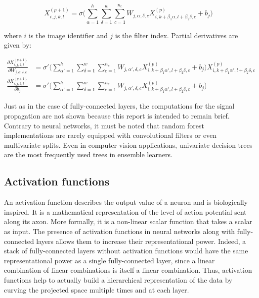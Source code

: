         \begin{equation} \label{eq:conv2D}
            X_{i, j, k, l}^{(p+1)} = \sigma \Big( \sum\limits_{\alpha=1}^h \sum\limits_{\delta=1}^w
                \sum\limits_{c=1}^{n_c} W_{j, \alpha, \delta, c} X_{i, k+\beta_1 \alpha, l+\beta_2 \delta, c}^{(p)} + b_{j} \Big)
        \end{equation}

        where $i$ is the image identifier and $j$ is the filter index.
        Partial derivatives are given by:

        \begin{align}
            \frac{\partial X_{i, j, k, l}^{(p+1)}}{\partial W_{j, \alpha, \delta, c}} & =
                \sigma' \Big( \sum\limits_{\alpha'=1}^h \sum\limits_{\delta=1}^w \sum\limits_{c=1}^{n_c} W_{j, \alpha', \delta, c}
                X_{i, k+\beta_1 \alpha', l+\beta_2 \delta, c}^{(p)} + b_{j} \Big) X_{i, k+\beta_1 \alpha', l+\beta_2 \delta, c}^{(p)} \\
            \frac{\partial X_{i, j, k, l}^{(p+1)}}{\partial b_{j}} & =
                \sigma' \Big( \sum\limits_{\alpha'=1}^h \sum\limits_{\delta=1}^w \sum\limits_{c=1}^{n_c} W_{j, \alpha', \delta, c}
                X_{i, k+\beta_1 \alpha', l+\beta_2 \delta, c}^{(p)} + b_{j} \Big)
        \end{align}

        Just as in the case of fully-connected layers, the computations for the signal propagation
        are not shown because this report is intended to remain brief.
        Contrary to neural networks, it must be noted that random forest implementations
        are rarely equipped with convolutional filters or even multivariate splits.
        Even in computer vision applications, univariate decision trees are the most frequently used trees in ensemble learners.

    \subsection{Activation functions}\label{activationfunctions}

        An activation function describes the output value of a neuron and is biologically inspired. It is a mathematical representation
        of the level of action potential sent along its axon. More formally, it is a non-linear scalar function that takes a scalar as input.
        The presence of activation functions in neural networks along with fully-connected layers allows them to increase their representational
        power. Indeed, a stack of fully-connected layers without activation functions would have the same representational power as a single
        fully-connected layer, since a linear combination of linear combinations is itself a linear combination. Thus, activation functions
        help to actually build a hierarchical representation of the data by curving the projected space multiple times and at each layer.

